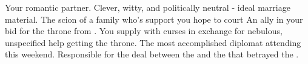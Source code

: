 \documentclass[char]{GL2020}
\begin{document}
\begin{itemz}[Notes]
	\item 
\end{itemz}

\begin{contacts}
	\contact{\cPirate{}} Your romantic partner. Clever, witty, and politically neutral - ideal marriage material.
	\contact{\cAdopted{}} The scion of a family who’s support you hope to court
	\contact{\cAntiChup{}} An ally in your bid for the throne from \pTech{}. You supply \cAntiChup{\them} with curses in exchange for nebulous, unspecified help getting the throne.
	\contact{\cDiplomat{}} The most accomplished diplomat attending this weekend. Responsible for the deal between the \pFarm{} and the \pTech{} that betrayed the \pShip{}.
\end{contacts}
\end{document}
